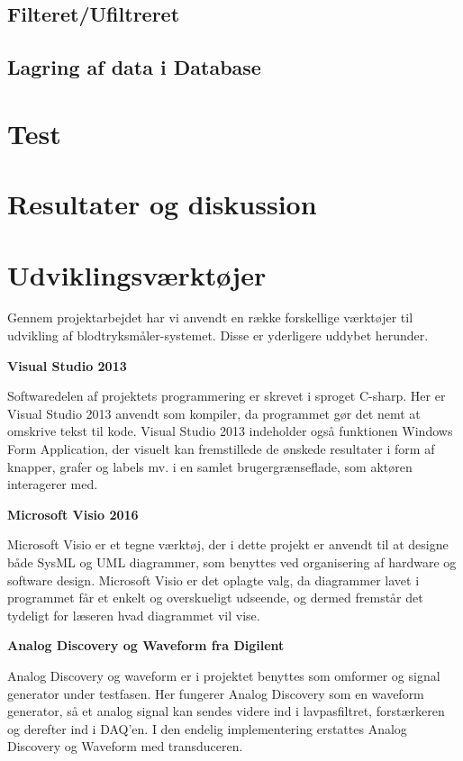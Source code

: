 \subsection{Filteret/Ufiltreret}
\subsection{Lagring af data i Database}

\section{Test}
\section{Resultater og diskussion}
\section{Udviklingsværktøjer}
Gennem projektarbejdet har vi anvendt en række forskellige værktøjer til udvikling af blodtryksmåler-systemet. Disse er yderligere uddybet herunder.

\textbf{Visual Studio 2013}

Softwaredelen af projektets programmering er skrevet i sproget C-sharp. Her er Visual Studio 2013 anvendt som kompiler, da programmet gør det nemt at omskrive tekst til kode. Visual Studio 2013 indeholder også funktionen Windows Form Application, der visuelt kan fremstillede de ønskede resultater i form af knapper, grafer og labels mv. i en samlet brugergrænseflade, som aktøren interagerer med. 

\textbf{Microsoft Visio 2016}

Microsoft Visio er et tegne værktøj, der i dette projekt er anvendt til at designe både SysML og UML diagrammer, som benyttes ved organisering af hardware og software design. Microsoft Visio er det oplagte valg, da diagrammer lavet i programmet får et enkelt og overskueligt udseende, og dermed fremstår det tydeligt for læseren hvad diagrammet vil vise.

\textbf{Analog Discovery og Waveform fra Digilent}

Analog Discovery og waveform er i projektet benyttes som omformer og signal generator under testfasen. Her fungerer Analog Discovery som en waveform generator, så et analog signal kan sendes videre ind i lavpasfiltret, forstærkeren og derefter ind i DAQ’en. I den endelig implementering erstattes Analog Discovery og Waveform med transduceren. 

